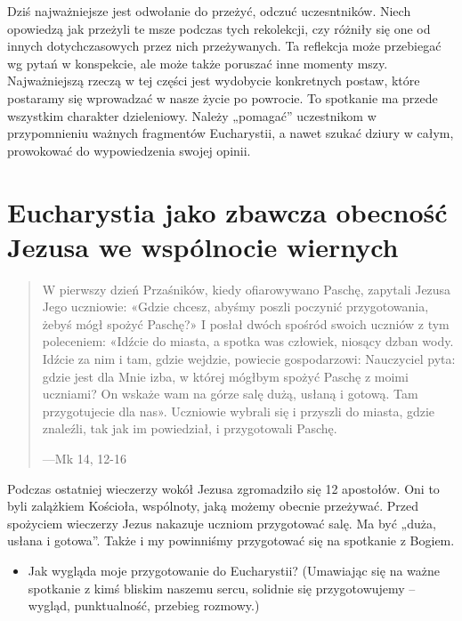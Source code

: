 \documentclass[a5paper,10pt,polish]{book}
\begin{document}
Dziś najważniejsze jest odwołanie do przeżyć, odczuć uczesntników. Niech opowiedzą jak przeżyli te msze podczas tych rekolekcji, czy różniły się one od innych dotychczasowych przez nich przeżywanych. Ta reflekcja może przebiegać wg pytań w konspekcie, ale może także poruszać inne momenty mszy. Najważniejszą rzeczą w tej części jest wydobycie konkretnych postaw, które postaramy się wprowadzać w nasze życie po powrocie. To spotkanie ma przede wszystkim charakter dzieleniowy. Należy „pomagać” uczestnikom w przypomnieniu ważnych fragmentów Eucharystii, a nawet szukać dziury w całym, prowokować do wypowiedzenia swojej opinii.


\section{Eucharystia jako zbawcza obecność Jezusa we wspólnocie wiernych}
\label{babice2006-jesien-knurow/spotkanie3:eucharystia-jako-zbawcza-obecnosc-jezusa-we-wspolnocie-wiernych}\begin{quote}

W pierwszy dzień Przaśników, kiedy ofiarowywano Paschę, zapytali Jezusa Jego uczniowie: «Gdzie chcesz, abyśmy poszli poczynić przygotowania, żebyś mógł spożyć Paschę?» I posłał dwóch spośród swoich uczniów z tym poleceniem: «Idźcie do miasta, a spotka was człowiek, niosący dzban wody. Idźcie za nim i tam, gdzie wejdzie, powiecie gospodarzowi: Nauczyciel pyta: gdzie jest dla Mnie izba, w której mógłbym spożyć Paschę z moimi uczniami? On wskaże wam na górze salę dużą, usłaną i gotową. Tam przygotujecie dla nas». Uczniowie wybrali się i przyszli do miasta, gdzie znaleźli, tak jak im powiedział, i przygotowali Paschę.

\begin{flushright}
---Mk 14, 12-16
\end{flushright}
\end{quote}

Podczas ostatniej wieczerzy wokół Jezusa zgromadziło się 12 apostołów. Oni to byli zalążkiem Kościoła, wspólnoty, jaką możemy obecnie przeżywać. Przed spożyciem wieczerzy Jezus nakazuje uczniom przygotować salę. Ma być „duża, usłana i gotowa”. Także i my powinniśmy przygotować się na spotkanie z Bogiem.
\begin{itemize}
\item {} 
Jak wygląda moje przygotowanie do Eucharystii? (Umawiając się na ważne spotkanie z kimś bliskim naszemu sercu, solidnie się przygotowujemy – wygląd, punktualność, przebieg rozmowy.)

\end{itemize}
\end{document}

